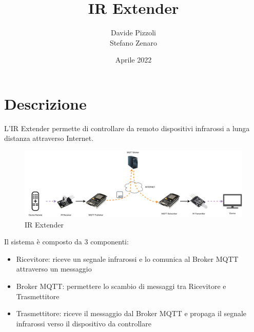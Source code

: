 \documentclass[a4paper,11pt]{article}
\begin{document}
\title{IR Extender}
\author{Davide Pizzoli \\ Stefano Zenaro}
\date{Aprile 2022}


\begin{titlepage}
  \maketitle
  \thispagestyle{empty}
\end{titlepage}

\tableofcontents
{}
\clearpage


\section{Descrizione}

    L'IR Extender permette di controllare da remoto dispositivi infrarossi a lunga distanza attraverso Internet.

    \begin{figure}[H]
      \centering
      \includegraphics[width=\textwidth,height=\textheight,keepaspectratio]{assets/ir_extender}
      \caption{IR Extender}
    \end{figure}

    Il sistema è composto da 3 componenti:
    \begin{itemize}
      \item Ricevitore: riceve un segnale infrarossi e lo comunica al Broker MQTT attraverso un messaggio
      \item Broker MQTT: permettere lo scambio di messaggi tra Ricevitore e Trasmettitore
      \item Trasmettitore: riceve il messaggio dal Broker MQTT e propaga il segnale infrarossi verso il dispositivo da controllare
    \end{itemize}

\end{document}
